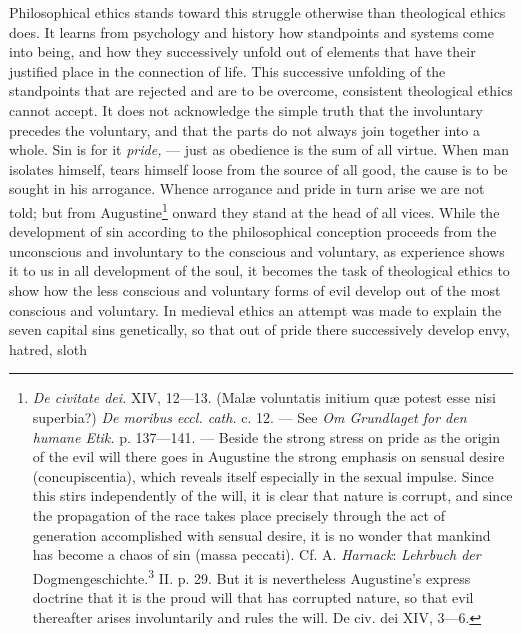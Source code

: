 \documentclass[12pt,a4paper,openany]{book}
\newcommand{\opage}[1]{\marginnote{\footnotesize\textit{[#1]}}}
\begin{document}
Philosophical ethics stands toward this struggle otherwise than theological ethics does. It learns from
psychology and history how standpoints and systems come into being, and how they successively unfold out
of elements that have their justified place in the connection of life. This successive unfolding of
\opage{129}the standpoints that are rejected and are to be overcome, consistent theological ethics cannot
accept. It does not acknowledge the simple truth that the involuntary precedes the voluntary, and that the
parts do not always join together into a whole. Sin is for it \textit{pride,} --- just as obedience is the
sum of all virtue. When man isolates himself, tears himself loose from the source of all good, the cause
is to be sought in his arrogance. Whence arrogance and pride in turn arise we are not told; but from
Augustine\footnote[1]{\textit{De civitate dei.} XIV, 12---13. (Malæ voluntatis initium quæ potest esse
nisi superbia?) \textit{De moribus eccl. cath.} c. 12. --- See \textit{Om Grundlaget for den humane Etik.}
p. 137---141. --- Beside the strong stress on pride as the origin of the evil will there goes in Augustine
the strong emphasis on sensual desire (concupiscentia), which reveals itself especially in the sexual
impulse. Since this stirs independently of the will, it is clear that nature is corrupt, and since the
propagation of the race takes place precisely through the act of generation accomplished with sensual
desire, it is no wonder that mankind has become a chaos of sin (massa peccati). Cf. A. \emph{Harnack}:
\textit{Lehrbuch der} Dogmengeschichte.\textsuperscript{3} II. p. 29. But it is nevertheless Augustine's
express doctrine that it is the proud will that has corrupted nature, so that evil thereafter arises
involuntarily and rules the will. De civ. dei XIV, 3---6.} onward they stand at the head of all vices.
While the development of sin according to the philosophical conception proceeds from the unconscious and
involuntary to the conscious and voluntary, as experience shows it to us in all development of the soul,
it becomes the task of theological ethics to show how the less conscious and voluntary forms of evil
develop out of the most conscious and voluntary. In medieval ethics an attempt was made to explain the
seven capital sins genetically, so that out of pride there successively develop envy, hatred, sloth
\end{document}
